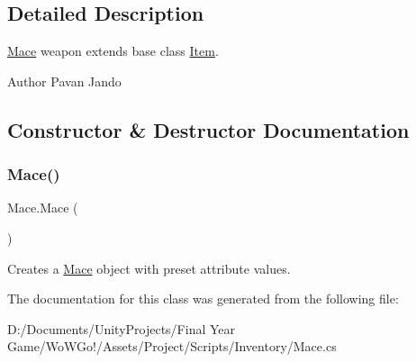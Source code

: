 \subsection{Detailed Description}
\mbox{\hyperlink{class_mace}{Mace}} weapon extends base class \mbox{\hyperlink{class_item}{Item}}. 

\begin{DoxyAuthor}{Author}
Pavan Jando
\end{DoxyAuthor}


\subsection{Constructor \& Destructor Documentation}
\mbox{\label{class_mace_ac2299236716c045cbe4b9977394ebd9c}} 
\subsubsection{\texorpdfstring{Mace()}{Mace()}}
{\footnotesize\ttfamily Mace.\+Mace (\begin{DoxyParamCaption}{ }\end{DoxyParamCaption})}



Creates a \mbox{\hyperlink{class_mace}{Mace}} object with preset attribute values. 



The documentation for this class was generated from the following file\+:\begin{DoxyCompactItemize}
\item 
D\+:/\+Documents/\+Unity\+Projects/\+Final Year Game/\+Wo\+W\+Go!/\+Assets/\+Project/\+Scripts/\+Inventory/Mace.\+cs\end{DoxyCompactItemize}
